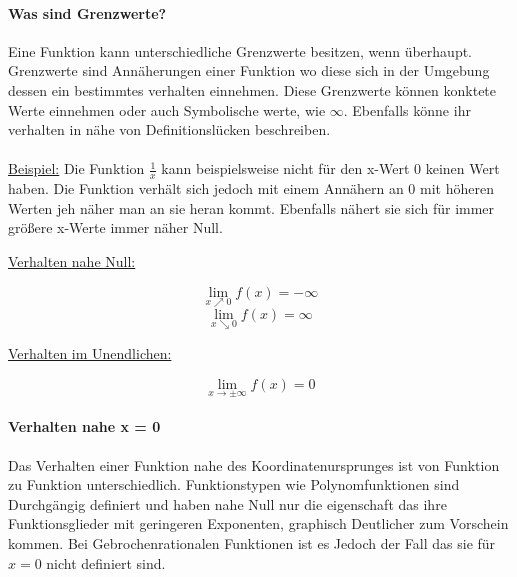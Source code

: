 \documentclass{article}
\begin{document}
		\paragraph{Was sind Grenzwerte?} \label{Definitionsbereich}
			Eine Funktion kann unterschiedliche Grenzwerte besitzen, wenn überhaupt. Grenzwerte sind Annäherungen einer Funktion wo diese sich in der Umgebung dessen ein bestimmtes verhalten einnehmen. Diese Grenzwerte können konktete Werte einnehmen oder auch Symbolische werte, wie $\infty$. Ebenfalls könne ihr verhalten in nähe von Definitionslücken beschreiben.\\ \\
			\underline{Beispiel:} Die Funktion $ \frac {1} {x}$ kann beispielsweise nicht für den x-Wert $0$ keinen Wert haben. Die Funktion verhält sich jedoch mit einem Annähern an $0$ mit höheren Werten jeh näher man an sie heran kommt. Ebenfalls nähert sie sich für immer größere x-Werte immer näher Null.
			
		\begin{multicols}{2}
		
		
		\underline{Verhalten nahe Null:}
		
		\[\lim\limits_{x \nearrow 0} f(x) = - \infty\]
		\[\lim\limits_{x \searrow 0} f(x) =  \infty\]
		
		\underline{Verhalten im Unendlichen:}
		
		\[\lim\limits_{x \rightarrow \pm \infty} f(x) = 0\]
		
		\end{multicols}
				
		\paragraph{Verhalten nahe x = 0 \\}\label{Verhalten nahe Null}
			Das Verhalten einer Funktion nahe des Koordinatenursprunges ist von Funktion zu Funktion unterschiedlich. Funktionstypen wie Polynomfunktionen sind Durchgängig definiert und haben nahe Null nur die eigenschaft das ihre Funktionsglieder mit geringeren Exponenten, graphisch Deutlicher zum Vorschein kommen. Bei Gebrochenrationalen Funktionen ist es Jedoch der Fall das sie für $x = 0$ nicht definiert sind.\\
			
\end{document}
